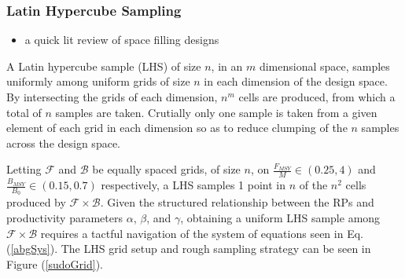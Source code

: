 \documentclass[12pt]{article}
\begin{document}
%
\clearpage	
\subsubsection{Latin Hypercube Sampling}

	\begin{itemize}
		\item {\color{red}a quick lit review of space filling designs}
	\end{itemize}

%
A Latin hypercube sample (LHS) of size $n$, in an $m$ dimensional space, samples 
uniformly among uniform grids of size $n$ in each dimension of the design space. By 
intersecting the grids of each dimension, $n^m$ cells are produced, from which 
a total of $n$ samples are taken. Crutially only one sample is taken from a given element 
of each grid in each dimension so as to reduce clumping of the $n$ samples 
across the design space.  

%
Letting $\mathcal{F}$ and $\mathcal{B}$ be equally spaced grids, of size $n$, on 
\mbox{$\frac{F_{MSY}}{M}\in(0.25, 4)$} and \mbox{$\frac{B_{MSY}}{B_0}\in(0.15, 0.7)$}
respectively, a LHS samples 1 point in $n$ of the $n^2$ cells produced by 
$\mathcal{F}\times\mathcal{B}$.
%
%
Given the structured relationship between the RPs and productivity parameters 
$\alpha$, $\beta$, and $\gamma$, obtaining a uniform LHS sample among 
$\mathcal{F}\times\mathcal{B}$ requires a tactful navigation of the system of 
equations seen in Eq. (\ref{abgSys}). The LHS grid setup and rough sampling strategy 
can be seen in Figure (\ref{sudoGrid}).
\end{document}
